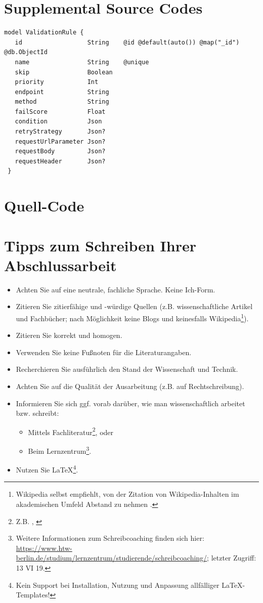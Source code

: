  \section{Supplemental Source Codes}
 
  \begin{lstlisting}[caption={\emph{Prisma} schema of a validation rule (Prisma)}, label={code:prisma}]
 model ValidationRule {
   id                  String    @id @default(auto()) @map("_id") @db.ObjectId
   name                String    @unique
   skip                Boolean
   priority            Int
   endpoint            String
   method              String
   failScore           Float
   condition           Json
   retryStrategy       Json?
   requestUrlParameter Json?
   requestBody         Json?
   requestHeader       Json?
 }
  \end{lstlisting}

\section{Quell-Code}

\section{Tipps zum Schreiben Ihrer Abschlussarbeit}

\begin{itemize}
\item Achten Sie auf eine neutrale, fachliche Sprache. Keine \glqq{}Ich\grqq{}-Form.
\item Zitieren Sie zitierf\"ahige und -w\"urdige Quellen (z.B. wissenschaftliche Artikel und Fachb\"ucher; nach M\"oglichkeit keine Blogs und keinesfalls Wikipedia\footnote{Wikipedia selbst empfiehlt, von der Zitation von Wikipedia-Inhalten im akademischen Umfeld Abstand zu nehmen \autocite{wikipedia2019}.}). 
\item Zitieren Sie korrekt und homogen.
\item Verwenden Sie keine Fu{\ss}noten f\"ur die Literaturangaben.
\item Recherchieren Sie ausf\"uhrlich den Stand der Wissenschaft und Technik.
\item Achten Sie auf die Qualit\"at der Ausarbeitung (z.B. auf Rechtschreibung).
\item Informieren Sie sich ggf. vorab dar\"uber, wie man wissenschaftlich arbeitet bzw. schreibt:
\begin{itemize}
\item Mittels Fachliteratur\footnote{Z.B. \autocite{balzert2011}, \autocite{franck2013}}, oder
\item Beim Lernzentrum\footnote{Weitere Informationen zum Schreibcoaching finden sich hier: \url{https://www.htw-berlin.de/studium/lernzentrum/studierende/schreibcoaching/}; letzter Zugriff: 13 VI 19.}.
\end{itemize}
\item Nutzen Sie \LaTeX\footnote{Kein Support bei Installation, Nutzung und Anpassung allf\"alliger \LaTeX-Templates!}.
\end{itemize}



\newpage
\thispagestyle{empty}      
\noindent

\newpage
